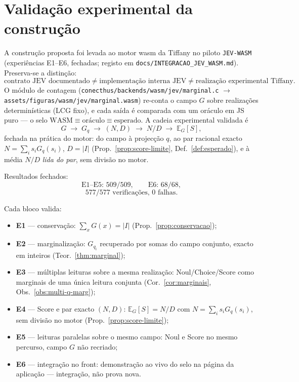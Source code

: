 \documentclass[11pt,a4paper]{article}
\begin{document}
\section{Validação experimental da construção}

A construção proposta foi levada ao motor wasm da Tiffany no piloto
\texttt{JEV-WASM} (experiências E1--E6, fechadas; registo em
\texttt{docs/INTEGRACAO\_JEV\_WASM.md}). Preserva-se a distinção:
\[
\boxed{
\text{contrato JEV documentado}
\neq
\text{implementação interna JEV}
\neq
\text{realização experimental Tiffany}.
}
\]
O módulo de contagem
(\texttt{conecthus/backends/wasm/jev/marginal.c}
\(\to\) \texttt{assets/figuras/wasm/jev/marginal.wasm}) re-conta o campo \(G\)
sobre realizações determinísticas (LCG fixo), e cada saída é comparada com um
oráculo em JS puro --- o selo
\(\text{WASM}\equiv\text{oráculo}\equiv\text{esperado}\). A cadeia experimental
validada é
\[
\boxed{
G
\;\to\;
G_q
\;\to\;
(N,D)
\;\to\;
N/D
\;\to\;
\mathbb E_G[S],
}
\]
fechada na prática do motor: do campo à projecção \(q\), ao par racional exacto
\(N=\sum_i s_iG_q(s_i)\), \(D=\lvert I\rvert\)
(Prop.~\ref{prop:score-limite}, Def.~\ref{def:esperado}), e à média \(N/D\)
\emph{lida do par}, sem divisão no motor.

Resultados fechados:
\[
\text{E1--E5: }509/509,\qquad
\text{E6: }68/68,
\]
\[
\boxed{577/577\text{ verificações, }0\text{ falhas}.}
\]

Cada bloco valida:
\begin{itemize}[leftmargin=1.5em]
\item \textbf{E1} --- conservação: \(\sum_x G(x)=\lvert I\rvert\)
      (Prop.~\ref{prop:conservacao});
\item \textbf{E2} --- marginalização: \(G_{q_i}\) recuperado por somas do campo
      conjunto, exacto em inteiros (Teor.~\ref{thm:marginal});
\item \textbf{E3} --- múltiplas leituras sobre a mesma realização:
      Noul/Choice/Score como marginais de uma única leitura conjunta
      (Cor.~\ref{cor:marginais}, Obs.~\ref{obs:multi-q-marg});
\item \textbf{E4} --- Score e par exacto \((N,D)\): \(\mathbb E_G[S]=N/D\) com
      \(N=\sum_i s_iG_q(s_i)\), sem divisão no motor
      (Prop.~\ref{prop:score-limite});
\item \textbf{E5} --- leituras paralelas sobre o mesmo campo: Noul e Score no
      mesmo percurso, campo \(G\) não recriado;
\item \textbf{E6} --- integração no front: demonstração ao vivo do selo na
      página da aplicação --- integração, não prova nova.
\end{itemize}
\end{document}
